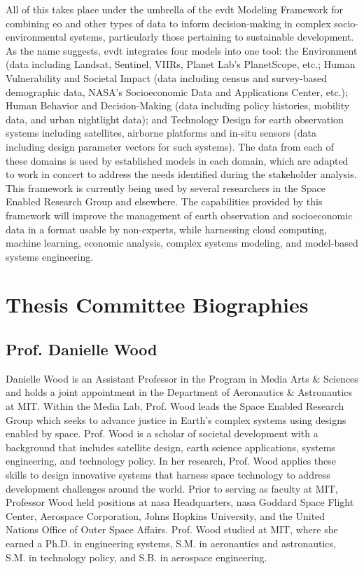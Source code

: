 \documentclass[notitlepage]{article}
\begin{document}
All of this takes place under the umbrella of the \ac{evdt} Modeling Framework for combining \ac{eo} and other types of data to inform decision-making in complex socio-environmental systems, particularly those pertaining to sustainable development. As the name suggests, \ac{evdt} integrates four models into one tool: the Environment (data including Landsat, Sentinel, VIIRs, Planet Lab’s PlanetScope, etc.; Human Vulnerability and Societal Impact (data including census and survey-based demographic data, NASA’s Socioeconomic Data and Applications Center, etc.); Human Behavior and Decision-Making (data including policy histories, mobility data, and urban nightlight data); and Technology Design for earth observation systems including satellites, airborne platforms and in-situ sensors (data including design parameter vectors for such systems). The data from each of these domains is used by established models in each domain, which are adapted to work in concert to address the needs identified during the stakeholder analysis. This framework is currently being used by several researchers in the Space Enabled Research Group and elsewhere. The capabilities provided by this framework will improve the management of earth observation and socioeconomic data in a format usable by non-experts, while harnessing cloud computing, machine learning, economic analysis, complex systems modeling, and model-based systems engineering.


\newpage

\section*{Thesis Committee Biographies}

\subsection*{Prof. Danielle Wood}

Danielle Wood is an Assistant Professor in the Program in Media Arts \& Sciences and holds a joint appointment in the Department of Aeronautics \& Astronautics at MIT. Within the Media Lab, Prof. Wood leads the Space Enabled Research Group which seeks to advance justice in Earth's complex systems using designs enabled by space. Prof. Wood is a scholar of societal development with a background that includes satellite design, earth science applications, systems engineering, and technology policy. In her research, Prof. Wood applies these skills to design innovative systems that harness space technology to address development challenges around the world. Prior to serving as faculty at MIT, Professor Wood held positions at \ac{nasa} Headquarters, \ac{nasa} Goddard Space Flight Center, Aerospace Corporation, Johns Hopkins University, and the United Nations Office of Outer Space Affairs. Prof. Wood studied at MIT, where she earned a Ph.D. in engineering systems, S.M. in aeronautics and astronautics, S.M. in technology policy, and S.B. in aerospace engineering.
\end{document}
